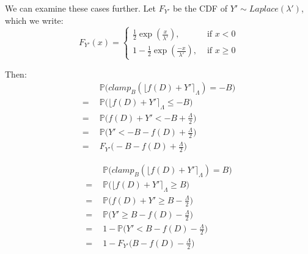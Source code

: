 \documentclass[11pt]{scrartcl} %
\begin{document}
We can examine these cases further. Let $F_{Y'}$ be the CDF of $Y' \sim Laplace(\lambda')$, which we write:
\begin{equation}
	F_{Y'}(x) =
		\begin{cases}
			\frac{1}{2} \exp \left( \frac{x}{\lambda'} \right), &\text{ if } x < 0 \\
			1 - \frac{1}{2} \exp \left( \frac{-x}{\lambda'} \right), &\text{ if } x \geq 0
		\end{cases}
\end{equation}

Then:
\begin{align}
	               &\mathbb{P} \big( clamp_B\left( \lfloor f(D) + Y' \rceil_{\Lambda} \right) = -B \big) \nonumber \\
	= \hspace{5pt} &\mathbb{P} \big( \lfloor f(D) + Y' \rceil_{\Lambda} \leq -B \big) \nonumber \\
	= \hspace{5pt} &\mathbb{P} \big( f(D) + Y' < -B + \frac{\Lambda}{2} \big) \nonumber \\
	= \hspace{5pt} &\mathbb{P} \big( Y' < -B - f(D) + \frac{\Lambda}{2} \big) \nonumber \\
	= \hspace{5pt} &F_{Y'} \big( -B - f(D) + \frac{\Lambda}{2} \big) \nonumber
\end{align}

\begin{align}
	               &\mathbb{P} \big( clamp_B\left( \lfloor f(D) + Y' \rceil_{\Lambda} \right) = B \big) \nonumber \\
	= \hspace{5pt} &\mathbb{P} \big( \lfloor f(D) + Y' \rceil_{\Lambda} \geq B \big) \nonumber \\
	= \hspace{5pt} &\mathbb{P} \big( f(D) + Y' \geq B - \frac{\Lambda}{2} \big) \nonumber \\
	= \hspace{5pt} &\mathbb{P} \big( Y' \geq B - f(D) - \frac{\Lambda}{2} \big) \nonumber \\
	= \hspace{5pt} &1 - \mathbb{P} \big( Y' < B - f(D) - \frac{\Lambda}{2} \big) \nonumber \\
	= \hspace{5pt} &1 - F_{Y'} \big( B - f(D) - \frac{\Lambda}{2} \big) \nonumber
\end{align}
\end{document}
